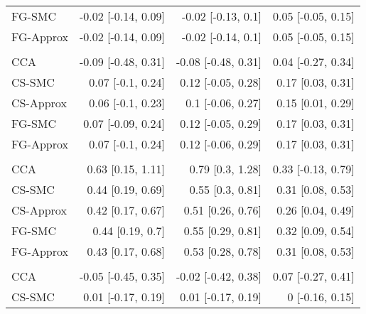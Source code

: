 \documentclass[
  12pt,
  a4paper,
]{article}
\begin{document}
\begin{longtable}[t]{lrrr}
\hspace{1em}FG-SMC & -0.02 [-0.14, 0.09] & -0.02 [-0.13, 0.1] & 0.05 [-0.05, 0.15]\\
\hspace{1em}FG-Approx & -0.02 [-0.14, 0.09] & -0.02 [-0.14, 0.1] & 0.05 [-0.05, 0.15]\\
\addlinespace[0.3em]
\multicolumn{4}{l}{\textbf{Karnofsky ($80$)}}\\
\hspace{1em}CCA & -0.09 [-0.48, 0.31] & -0.08 [-0.48, 0.31] & 0.04 [-0.27, 0.34]\\
\hspace{1em}CS-SMC & 0.07 [-0.1, 0.24] & 0.12 [-0.05, 0.28] & 0.17 [0.03, 0.31]\\
\hspace{1em}CS-Approx & 0.06 [-0.1, 0.23] & 0.1 [-0.06, 0.27] & 0.15 [0.01, 0.29]\\
\hspace{1em}FG-SMC & 0.07 [-0.09, 0.24] & 0.12 [-0.05, 0.29] & 0.17 [0.03, 0.31]\\
\hspace{1em}FG-Approx & 0.07 [-0.1, 0.24] & 0.12 [-0.06, 0.29] & 0.17 [0.03, 0.31]\\
\addlinespace[0.3em]
\multicolumn{4}{l}{\textbf{Karnofsky ($\leq 70$)}}\\
\hspace{1em}CCA & 0.63 [0.15, 1.11] & 0.79 [0.3, 1.28] & 0.33 [-0.13, 0.79]\\
\hspace{1em}CS-SMC & 0.44 [0.19, 0.69] & 0.55 [0.3, 0.81] & 0.31 [0.08, 0.53]\\
\hspace{1em}CS-Approx & 0.42 [0.17, 0.67] & 0.51 [0.26, 0.76] & 0.26 [0.04, 0.49]\\
\hspace{1em}FG-SMC & 0.44 [0.19, 0.7] & 0.55 [0.29, 0.81] & 0.32 [0.09, 0.54]\\
\hspace{1em}FG-Approx & 0.43 [0.17, 0.68] & 0.53 [0.28, 0.78] & 0.31 [0.08, 0.53]\\
\addlinespace[0.3em]
\multicolumn{4}{l}{\textbf{Disease subclassification: secondary MF}}\\
\hspace{1em}CCA & -0.05 [-0.45, 0.35] & -0.02 [-0.42, 0.38] & 0.07 [-0.27, 0.41]\\
\hspace{1em}CS-SMC & 0.01 [-0.17, 0.19] & 0.01 [-0.17, 0.19] & 0 [-0.16, 0.15]\\

\end{longtable}
\end{document}
